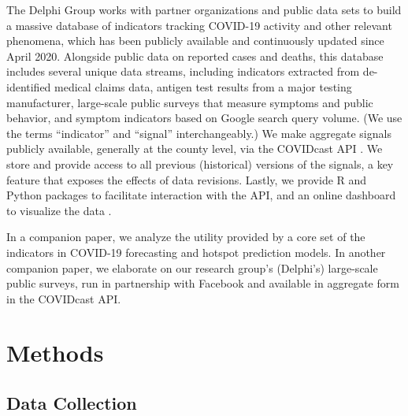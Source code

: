 \documentclass[9pt,twocolumn,twoside,lineno]{pnas-new}
\begin{document}
The Delphi Group works with partner organizations and public data sets to build
a massive database of indicators tracking COVID-19 activity and other relevant
phenomena, which has been publicly available and continuously updated since
April 2020. Alongside public data on reported cases and deaths, this database
includes several unique data streams, including indicators extracted from
de-identified medical claims data, antigen test results from a major testing
manufacturer, large-scale public surveys that measure symptoms and public
behavior, and symptom indicators based on Google search query volume. (We use
the terms ``indicator'' and ``signal'' interchangeably.) We make aggregate
signals publicly available, generally at the county level, via the COVIDcast API  
\cite{CovidcastAPI}. We store and provide access to all previous (historical)
versions of the signals, a key feature that exposes the effects of data
revisions.  Lastly, we provide R \cite{CovidcastR} and Python \cite{CovidcastPy}  
packages to facilitate interaction with the API, and an online dashboard to
visualize the data \cite{CovidcastViz}. 


In a companion paper, we analyze the utility provided by a core set of the
indicators in COVID-19 forecasting and hotspot prediction models.  In another
companion paper, we elaborate on our research group's (Delphi's) large-scale
public surveys, run in partnership with Facebook and available in aggregate form
in the COVIDcast API.

\section{Methods}

\subsection{Data Collection}
\end{document}
